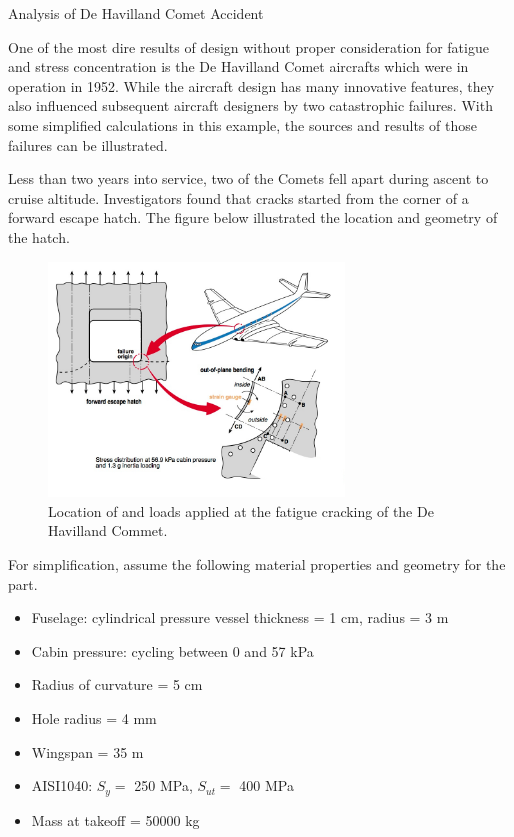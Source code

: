 \documentclass[
10pt,
a4paper,
openany,
svgnames,
]{book}
\begin{document}
\begin{example} Analysis of De Havilland Comet Accident

  One of the most dire results of design without proper consideration for fatigue and stress concentration is the De Havilland Comet aircrafts which were in operation in 1952. While the aircraft design has many innovative features, they also influenced subsequent aircraft designers by two catastrophic failures. With some simplified calculations in this example, the sources and results of those failures can be illustrated.

  Less than two years into service, two of the Comets fell apart during ascent to cruise altitude. Investigators found that cracks started from the corner of a forward escape hatch. The figure below illustrated the location and geometry of the hatch.

  \begin{figure}[H]
    \centering
    \includegraphics[width=0.7\textwidth]{pictures/Static-body-load-analysis/de-havilland-analysis}
    \caption*{Location of and loads applied at the fatigue cracking of the De Havilland Commet. \cite{swift1987damage,wanhill2015milestone}} 
  \end{figure}

  For simplification, assume the following material properties and geometry for the part.
  
  \begin{itemize}
  \item Fuselage: cylindrical pressure vessel thickness = 1 cm, radius = 3 m
  \item Cabin pressure: cycling between 0 and 57 kPa
  \item Radius of curvature = 5 cm
  \item Hole radius = 4 mm
  \item Wingspan = 35 m
  \item AISI1040: $S_y =$ 250 MPa, $S_{ut} =$ 400 MPa
  \item Mass at takeoff = 50000 kg
  \end{itemize}


\end{example}
\end{document}
